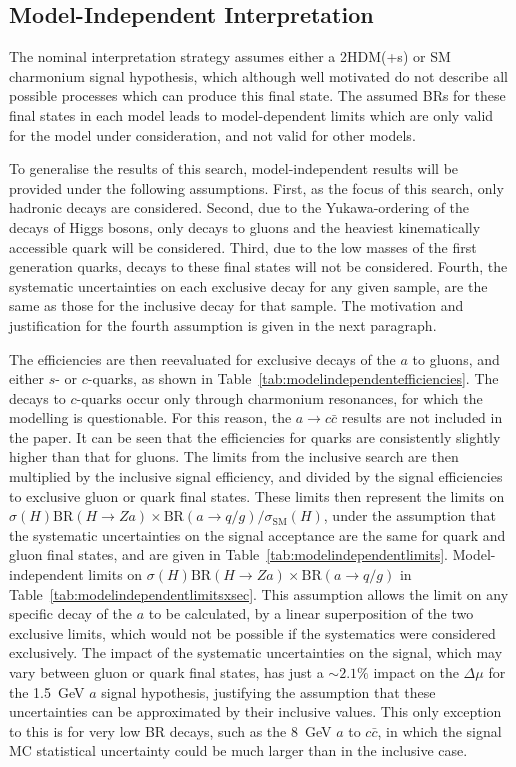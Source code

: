 \documentclass[NOTE, atlasdraft=true, texlive=2017, UKenglish]{\ATLASLATEXPATH atlasdoc}
\begin{document}
\subsection{Model-Independent Interpretation}
\label{sec:modelindependentresults}

The nominal interpretation strategy assumes either a 2HDM(+s) or SM charmonium signal hypothesis, which although well motivated do not describe all possible processes which can produce this final state. The assumed BRs for these final states in each model leads to model-dependent limits which are only valid for the model under consideration, and not valid for other models.

To generalise the results of this search, model-independent results will be provided under the following assumptions. First, as the focus of this search, only hadronic decays are considered. Second, due to the Yukawa-ordering of the decays of Higgs bosons, only decays to gluons and the heaviest kinematically accessible quark will be considered. Third, due to the low masses of the first generation quarks, decays to these final states will not be considered. Fourth, the systematic uncertainties on each exclusive decay for any given sample, are the same as those for the inclusive decay for that sample. The motivation and justification for the fourth assumption is given in the next paragraph.

The efficiencies are then reevaluated for exclusive decays of the $a$ to gluons, and either $s$- or $c$-quarks, as shown in Table~\ref{tab:modelindependentefficiencies}. The decays to $c$-quarks occur only through charmonium resonances, for which the modelling is questionable. For this reason, the $a\to c\bar c$ results are not included in the paper. It can be seen that the efficiencies for quarks are consistently slightly higher than that for gluons. The limits from the inclusive search are then multiplied by the inclusive signal efficiency, and divided by the signal efficiencies to exclusive gluon or quark final states. These limits then represent the limits on $\sigma(H)\text{BR}(H\to Za)\times\text{BR}(a\to q/g)/\sigma_\text{SM}(H)$, under the assumption that the systematic uncertainties on the signal acceptance are the same for quark and gluon final states, and are given in Table~\ref{tab:modelindependentlimits}. Model-independent limits on $\sigma(H)\text{BR}(H\to Za)\times\text{BR}(a\to q/g)$ in Table~\ref{tab:modelindependentlimitsxsec}. This assumption allows the limit on any specific decay of the $a$ to be calculated, by a linear superposition of the two exclusive limits, which would not be possible if the systematics were considered exclusively. The impact of the systematic uncertainties on the signal, which may vary between gluon or quark final states, has just a $\sim 2.1\%$ impact on the $\Delta\mu$ for the 1.5~GeV $a$ signal hypothesis, justifying the assumption that these uncertainties can be approximated by their inclusive values. This only exception to this is for very low BR decays, such as the 8~GeV $a$ to $c\bar c$, in which the signal MC statistical uncertainty could be much larger than in the inclusive case. %
\end{document}
